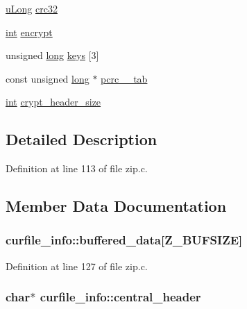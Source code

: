\begin{DoxyCompactItemize}
\item 
\hyperlink{zconf_8h_a154b3b80120c903a368fec5f11f3007a}{u\-Long} \hyperlink{structcurfile__info_ab58f6860a40fdaf0932d659d8743f876}{crc32}
\item 
\hyperlink{ioapi_8h_a787fa3cf048117ba7123753c1e74fcd6}{int} \hyperlink{structcurfile__info_a5bc94d3a94e6ffe7f4e4783c668a263e}{encrypt}
\item 
unsigned \hyperlink{ioapi_8h_a3c7b35ad9dab18b8310343c201f7b27e}{long} \hyperlink{structcurfile__info_ac6836b3fb49829e3490cae1e8e319ed6}{keys} \mbox{[}3\mbox{]}
\item 
const unsigned \hyperlink{ioapi_8h_a3c7b35ad9dab18b8310343c201f7b27e}{long} $\ast$ \hyperlink{structcurfile__info_a9de6dd632a0a1eaad2729ae1f993fa71}{pcrc\-\_\-\_\-tab}
\item 
\hyperlink{ioapi_8h_a787fa3cf048117ba7123753c1e74fcd6}{int} \hyperlink{structcurfile__info_aec9ef70b3fa0459612a2c2b5c8c2c4ea}{crypt\-\_\-header\-\_\-size}
\end{DoxyCompactItemize}


\subsection{Detailed Description}


Definition at line 113 of file zip.\-c.



\subsection{Member Data Documentation}
\hypertarget{structcurfile__info_a73ba705398941ee5d8f0cfc61df6b82d}{
\subsubsection[{buffered\-\_\-data}]{ curfile\-\_\-info\-::buffered\-\_\-data\mbox{[}Z\-\_\-\-B\-U\-F\-S\-I\-Z\-E\mbox{]}}}\label{structcurfile__info_a73ba705398941ee5d8f0cfc61df6b82d}


Definition at line 127 of file zip.\-c.

\hypertarget{structcurfile__info_a6b8d86737b9297846fc67799c8c42e21}{
\subsubsection[{central\-\_\-header}]{\setlength{\rightskip}{0pt plus 5cm}char$\ast$ curfile\-\_\-info\-::central\-\_\-header}}\label{structcurfile__info_a6b8d86737b9297846fc67799c8c42e21}


